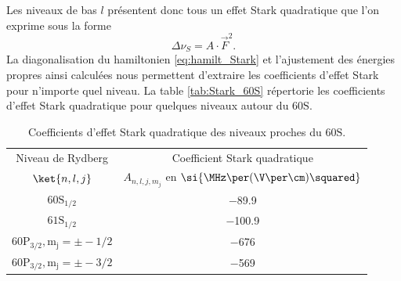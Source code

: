 Les niveaux de bas $l$ présentent donc tous un effet Stark quadratique que l'on exprime sous la forme
\begin{equation}
\label{eq:Stark_quad}
\Delta \nu_S = A\cdot\vec{F}^2.
\end{equation}
%
La diagonalisation du hamiltonien \eqref{eq:hamilt_Stark} et l'ajustement des énergies propres ainsi calculées nous permettent d'extraire les coefficients d'effet Stark pour n'importe quel niveau.
La table \eqref{tab:Stark_60S} répertorie les coefficients d'effet Stark quadratique pour quelques niveaux autour du $\mathrm{60S}$.

\begin{table}[!h]
	\centering
	\caption[Effet Stark quadratique des niveaux proches du $\mathrm{60S}$]{Coefficients d'effet Stark quadratique des niveaux proches du $\mathrm{60S}$.
	}
	\label{tab:Stark_60S}
	\begin{tabular}{c c }
		\toprule\midrule
		Niveau de Rydberg
		& Coefficient Stark quadratique
		\\
		$\ket{n,l,j}$
		& $A_{n,l,j,m_j}$ en $\si{\MHz \per (\V \per\cm) \squared}$ \\
		\midrule
		$\mathrm{60S_{1/2}}$
		& \SI{-89.9}{} \\
		$\mathrm{61S_{1/2}}$
		& \SI{-100.9}{} \\
		$\mathrm{60P_{3/2},m_j=\pm -1/2}$
		& \SI{-676}{} \\
		$\mathrm{60P_{3/2},m_j=\pm -3/2}$
		& \SI{-569}{} \\
		\midrule
		\bottomrule
 	\end{tabular}
\end{table}


